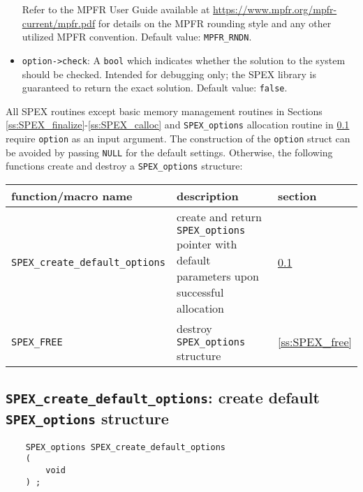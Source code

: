 \documentclass[12pt]{report}
\theoremstyle{definition}
\begin{document}
\begin{itemize}
\noindent Refer to the MPFR User Guide available at
\url{https://www.mpfr.org/mpfr-current/mpfr.pdf} for details on the MPFR
rounding style and any other utilized MPFR convention. Default value:
\verb|MPFR_RNDN|.

\item
\verb|option->check|: A \verb|bool| which indicates whether the solution to the
system should be checked. Intended for debugging only; the SPEX library is
guaranteed to return the exact solution. Default value: \verb|false|.

\end{itemize}

All SPEX routines except basic memory management routines in Sections
\ref{ss:SPEX_finalize}-\ref{ss:SPEX_calloc} and \verb|SPEX_options| allocation
routine in \ref{ss:create_default_options} require \verb|option| as an input
argument.  The construction of the \verb|option| struct can be avoided by
passing \verb|NULL| for the default settings.  Otherwise, the following
functions create and destroy a \verb|SPEX_options| structure:

\begin{center}
\begin{tabular}{lp{2.5in}l}
\hline
function/macro name & description & section \\
\hline
\verb|SPEX_create_default_options|
    & create and return \verb|SPEX_options| pointer
      with default parameters upon successful allocation
    & \ref{ss:create_default_options} \\
\hline
\verb|SPEX_FREE|
    & destroy \verb|SPEX_options| structure
    & \ref{ss:SPEX_free} \\
\hline
\end{tabular}
\end{center}

\cprotect\subsection{\verb|SPEX_create_default_options|: create default \verb|SPEX_options| structure}
\label{ss:create_default_options}

\begin{mdframed}[userdefinedwidth=6in]
{\footnotesize
\begin{verbatim}
    SPEX_options SPEX_create_default_options
    (
        void
    ) ;
\end{verbatim}
} \end{mdframed}
\end{document}
